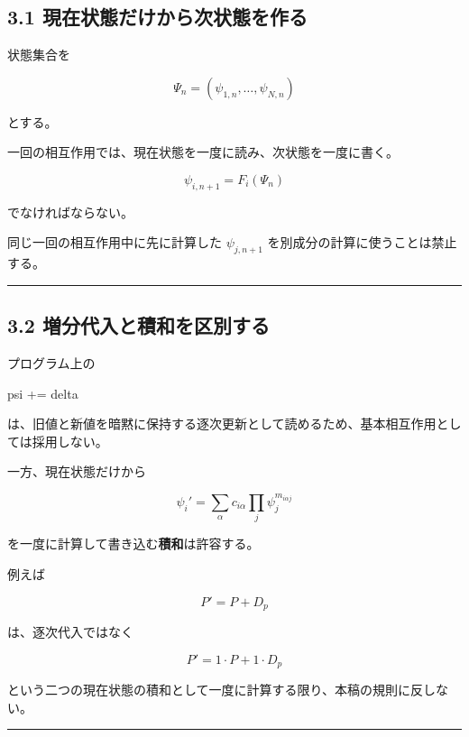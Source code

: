 \documentclass[
  a4paper,
]{ltjsarticle}
\newenvironment{Shaded}{}{}
\newcommand{\NormalTok}[1]{#1}
\begin{document}
\subsection{3.1
現在状態だけから次状態を作る}\label{ux73feux5728ux72b6ux614bux3060ux3051ux304bux3089ux6b21ux72b6ux614bux3092ux4f5cux308b}

状態集合を

\[
\Psi_n=(\psi_{1,n},\ldots,\psi_{N,n})
\]

とする。

一回の相互作用では、現在状態を一度に読み、次状態を一度に書く。

\[
\boxed{
\psi_{i,n+1}=F_i(\Psi_n)
}
\]

でなければならない。

同じ一回の相互作用中に先に計算した \(\psi_{j,n+1}\)
を別成分の計算に使うことは禁止する。

\begin{center}\rule{0.5\linewidth}{0.5pt}\end{center}

\subsection{3.2
増分代入と積和を区別する}\label{ux5897ux5206ux4ee3ux5165ux3068ux7a4dux548cux3092ux533aux5225ux3059ux308b}

プログラム上の

\begin{Shaded}
\begin{Highlighting}[]
\NormalTok{psi += delta}
\end{Highlighting}
\end{Shaded}

は、旧値と新値を暗黙に保持する逐次更新として読めるため、基本相互作用としては採用しない。

一方、現在状態だけから

\[
\psi_i'
=
\sum_{\alpha}
c_{i\alpha}
\prod_j \psi_j^{m_{i\alpha j}}
\]

を一度に計算して書き込む\textbf{積和}は許容する。

例えば

\[
P'=P+D_p
\]

は、逐次代入ではなく

\[
P'=1\cdot P+1\cdot D_p
\]

という二つの現在状態の積和として一度に計算する限り、本稿の規則に反しない。

\begin{center}\rule{0.5\linewidth}{0.5pt}\end{center}
\end{document}
